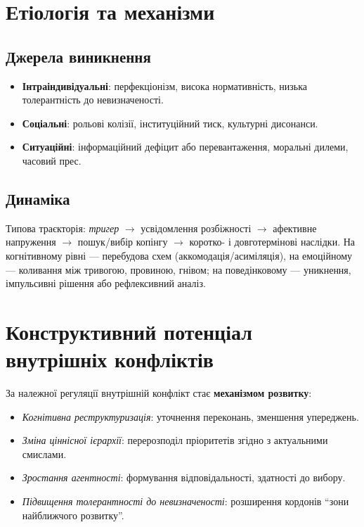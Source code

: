 \documentclass[12pt,a4paper]{article}
\begin{document}
\section{Етіологія та механізми}
\subsection{Джерела виникнення}
\begin{itemize}[left=6mm]
    \item \textbf{Інтраіндивідуальні}: перфекціонізм, висока нормативність, низька толерантність до невизначеності.
    \item \textbf{Соціальні}: рольові колізії, інституційний тиск, культурні дисонанси.
    \item \textbf{Ситуаційні}: інформаційний дефіцит або перевантаження, моральні дилеми, часовий прес.
\end{itemize}

\subsection{Динаміка}
Типова траєкторія: \emph{тригер} $\rightarrow$ усвідомлення розбіжності $\rightarrow$ афективне напруження $\rightarrow$ пошук/вибір копінгу $\rightarrow$ коротко- і довготермінові наслідки. На когнітивному рівні — перебудова схем (аккомодація/асиміляція), на емоційному — коливання між тривогою, провиною, гнівом; на поведінковому — уникнення, імпульсивні рішення або рефлексивний аналіз.

\section{Конструктивний потенціал внутрішніх конфліктів}
\label{sec:constructive}
За належної регуляції внутрішній конфлікт стає \textbf{механізмом розвитку}:
\begin{itemize}[left=6mm]
    \item \emph{Когнітивна реструктуризація}: уточнення переконань, зменшення упереджень.
    \item \emph{Зміна ціннісної ієрархії}: перерозподіл пріоритетів згідно з актуальними смислами.
    \item \emph{Зростання агентності}: формування відповідальності, здатності до вибору.
    \item \emph{Підвищення толерантності до невизначеності}: розширення кордонів \enquote{зони найближчого розвитку}.
\end{itemize}
\end{document}
